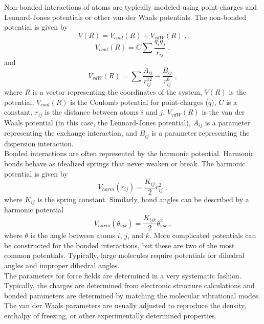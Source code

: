 \documentclass[12pt]{report}
\begin{document}
Non-bonded interactions of atoms are typically modeled using point-charges
and Lennard-Jones potentials or other van der Waals potentials.
The non-bonded potential is given by
\begin{equation}
 V(R) = V_{coul}(R)+V_{vdW}(R) \; ,
\end{equation}
\begin{equation}
 V_{coul}(R) = C\sum \frac{q_iq_j}{r_{ij}} \; ,
\end{equation}
and
\begin{equation}
 V_{vdW}(R) = \sum \frac{A_{ij}}{r_{ij}^{12}}
              -\frac{B_{ij}}{r_{ij}^{6}} \; ,
\end{equation}
where $R$ is a vector representing the coordinates of the system, $V(R)$ is the
potential, $V_{coul}(R)$ is the Coulomb potential for point-charges ($q$),
$C$ is a constant, $r_{ij}$ is the distance between atoms $i$ and $j$,
$V_{vdW}(R)$ is the van der Waals potential (in this case, the Lennard-Jones
potential), $A_{ij}$ is a parameter representing the exchange interaction, and
$B_{ij}$ is a parameter representing the dispersion interaction. \\

Bonded interactions are often represented by the harmonic potential.
Harmonic bonds behave as idealized springs that never weaken or break.
The harmonic potential is given by
\begin{equation}
 V_{harm}(r_{ij}) = \frac{K_{ij}}{2}r_{ij}^2 \; ,
\end{equation}
where $K_{ij}$ is the spring constant.
Similarly, bond angles can be described by a harmonic potential
\begin{equation}
 V_{harm}(\theta_{ijk}) = \frac{K_{ijk}}{2}\theta_{ijk}^2 \; ,
\end{equation}
where $\theta$ is the angle between atoms $i$, $j$, and $k$.
More complicated potentials can be constructed for the bonded interactions,
but these are two of the most common potentials.
Typically, large molecules require potentials for dihedral angles and improper
dihedral angles. \\

The parameters for force fields are determined in a very systematic fashion.
Typically, the charges are determined from electronic structure calculations
and bonded parameters are determined by matching the molecular vibrational
modes.
The van der Waals parameters are usually adjusted to reproduce the density,
enthalpy of freezing, or other experimentally determined properties.
\end{document}
